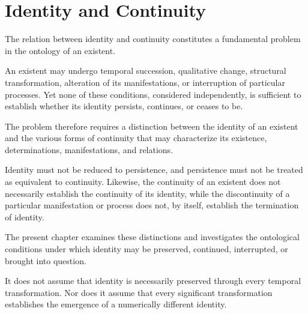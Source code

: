 
\chapter{Identity and Continuity}
\label{ch:identity-and-continuity}


\newcommand{\ChapterFiveTitle}{Identity and Continuity}
\newcommand{\ChapterFiveID}{VS.B01.P01.C05}


The relation between identity and continuity constitutes
a fundamental problem in the ontology of an existent.

An existent may undergo temporal succession, qualitative
change, structural transformation, alteration of its
manifestations, or interruption of particular processes.
Yet none of these conditions, considered independently,
is sufficient to establish whether its identity persists,
continues, or ceases to be.

The problem therefore requires a distinction between
the identity of an existent and the various forms of
continuity that may characterize its existence,
determinations, manifestations, and relations.

Identity must not be reduced to persistence, and persistence
must not be treated as equivalent to continuity.
Likewise, the continuity of an existent does not necessarily
establish the continuity of its identity, while the
discontinuity of a particular manifestation or process
does not, by itself, establish the termination of identity.

The present chapter examines these distinctions and
investigates the ontological conditions under which
identity may be preserved, continued, interrupted,
or brought into question.

It does not assume that identity is necessarily preserved
through every temporal transformation. Nor does it assume
that every significant transformation establishes the
emergence of a numerically different identity.

